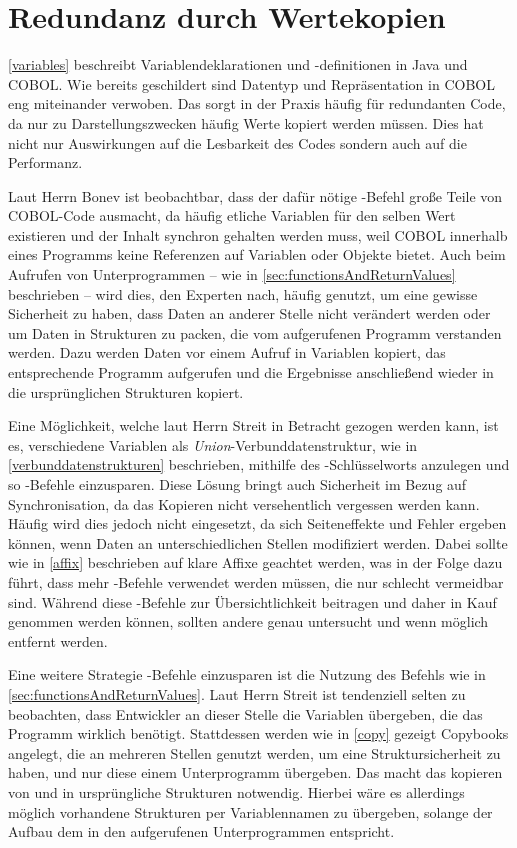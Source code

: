 \section{Redundanz durch Wertekopien}
\autoref{variables} beschreibt Variablendeklarationen und -definitionen in Java und COBOL. Wie bereits geschildert sind Datentyp und Repräsentation in COBOL eng miteinander verwoben. Das sorgt in der Praxis häufig für redundanten Code, da nur zu Darstellungszwecken häufig Werte kopiert werden müssen. Dies hat nicht nur Auswirkungen auf die Lesbarkeit des Codes sondern auch auf die Performanz.

Laut Herrn Bonev ist beobachtbar, dass der dafür nötige -Befehl große Teile von COBOL-Code ausmacht, da häufig etliche Variablen für den selben Wert existieren und der Inhalt synchron gehalten werden muss, weil COBOL innerhalb eines Programms keine Referenzen auf Variablen oder Objekte bietet. Auch beim Aufrufen von Unterprogrammen -- wie in \autoref{sec:functionsAndReturnValues} beschrieben -- wird dies, den Experten nach, häufig genutzt, um eine gewisse Sicherheit zu haben, dass Daten an anderer Stelle nicht verändert werden oder um Daten in Strukturen zu packen, die vom aufgerufenen Programm verstanden werden. Dazu werden Daten vor einem Aufruf in Variablen kopiert, das entsprechende Programm aufgerufen und die Ergebnisse anschließend wieder in die ursprünglichen Strukturen kopiert.

Eine Möglichkeit, welche laut Herrn Streit in Betracht gezogen werden kann, ist es, verschiedene Variablen als \textit{Union}-Verbunddatenstruktur, wie in \autoref{verbunddatenstrukturen} beschrieben, mithilfe des -Schlüsselworts anzulegen und so -Befehle einzusparen. Diese Lösung bringt auch Sicherheit im Bezug auf Synchronisation, da das Kopieren nicht versehentlich vergessen werden kann. Häufig wird dies jedoch nicht eingesetzt, da sich Seiteneffekte und Fehler ergeben können, wenn Daten an unterschiedlichen Stellen modifiziert werden. Dabei sollte wie in \autoref{affix} beschrieben auf klare Affixe geachtet werden, was in der Folge dazu führt, dass mehr -Befehle verwendet werden müssen, die nur schlecht vermeidbar sind. Während diese -Befehle zur Übersichtlichkeit beitragen und daher in Kauf genommen werden können, sollten andere genau untersucht und wenn möglich entfernt werden.

Eine weitere Strategie -Befehle einzusparen ist die Nutzung des  Befehls wie in \autoref{sec:functionsAndReturnValues}. Laut Herrn Streit ist tendenziell selten zu beobachten, dass Entwickler an dieser Stelle die Variablen übergeben, die das Programm wirklich benötigt. Stattdessen werden wie in \autoref{copy} gezeigt Copybooks angelegt, die an mehreren Stellen genutzt werden, um eine Struktursicherheit zu haben, und nur diese einem Unterprogramm übergeben. Das macht das kopieren von und in ursprüngliche Strukturen notwendig. Hierbei wäre es allerdings möglich vorhandene Strukturen per Variablennamen zu übergeben, solange der Aufbau dem in den aufgerufenen Unterprogrammen entspricht.

